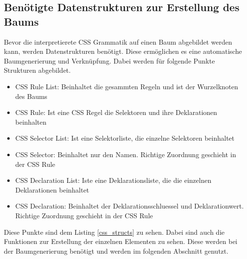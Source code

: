 \subsection{Benötigte Datenstrukturen zur Erstellung des Baums}
Bevor die interpretierete CSS Grammatik auf einen Baum abgebildet werden kann, werden Datenstrukturen benötigt. Diese ermöglichen es eine automatische Baumgenerierung und Verknüpfung. Dabei werden für folgende Punkte Strukturen abgebildet.
\begin{itemize}
\item{CSS Rule List: Beinhaltet die gesammten Regeln und ist der Wurzelknoten des Baums} 
\item{CSS Rule: Ist eine CSS Regel die Selektoren und ihre Deklarationen beinhalten} 
\item{CSS Selector List: Ist eine Selektorliste, die einzelne Selektoren beinhaltet} 
\item{CSS Selector: Beinhaltet nur den Namen. Richtige Zuordnung geschieht in der CSS Rule} 
\item{CSS Declaration List: Iste eine Deklarationsliste, die die einzelnen Deklarationen beinhaltet} 
\item{CSS Declaration: Beinhaltet der Deklarationsschluessel und Deklarationwert. Richtige Zuordnung geschieht in der CSS Rule} 
\end{itemize}
Diese Punkte sind dem Listing \ref{css_structs} zu sehen. Dabei sind auch die Funktionen zur Erstellung der einzelnen Elementen zu sehen. Diese werden bei der Baumgenerierung benötigt und werden im folgenden Abschnitt genutzt.

